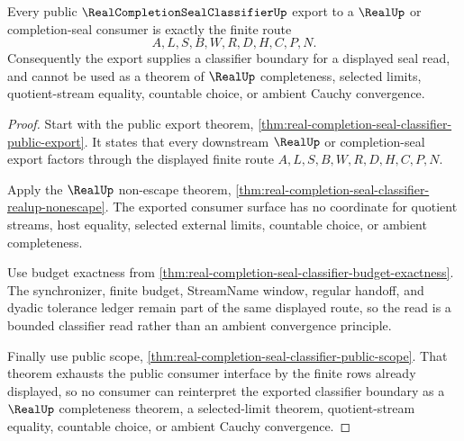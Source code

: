\begin{theorem}
\label{thm:real-completion-seal-classifier-completeness-boundary}
Every public $\RealCompletionSealClassifierUp$ export to a $\RealUp$ or completion-seal consumer is exactly the finite route
$$
A,L,S,B,W,R,D,H,C,P,N.
$$
Consequently the export supplies a classifier boundary for a displayed seal read, and cannot be used as a theorem of $\RealUp$ completeness, selected limits, quotient-stream equality, countable choice, or ambient Cauchy convergence.
\end{theorem}
\begin{proof}
Start with the public export theorem, \autoref{thm:real-completion-seal-classifier-public-export}. It states that every downstream $\RealUp$ or completion-seal export factors through the displayed finite route $A,L,S,B,W,R,D,H,C,P,N$.

Apply the $\RealUp$ non-escape theorem, \autoref{thm:real-completion-seal-classifier-realup-nonescape}. The exported consumer surface has no coordinate for quotient streams, host equality, selected external limits, countable choice, or ambient completeness.

Use budget exactness from \autoref{thm:real-completion-seal-classifier-budget-exactness}. The synchronizer, finite budget, StreamName window, regular handoff, and dyadic tolerance ledger remain part of the same displayed route, so the read is a bounded classifier read rather than an ambient convergence principle.

Finally use public scope, \autoref{thm:real-completion-seal-classifier-public-scope}. That theorem exhausts the public consumer interface by the finite rows already displayed, so no consumer can reinterpret the exported classifier boundary as a $\RealUp$ completeness theorem, a selected-limit theorem, quotient-stream equality, countable choice, or ambient Cauchy convergence.
\end{proof}



